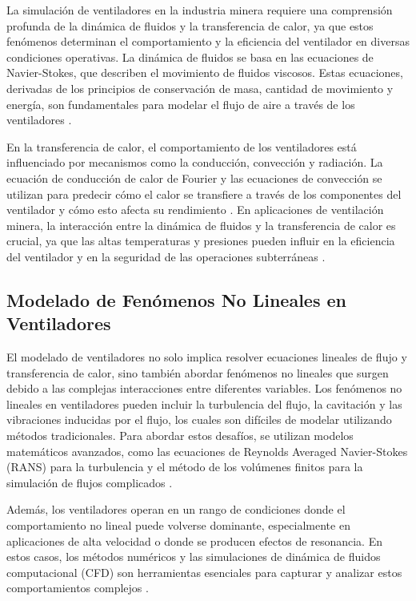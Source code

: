 La simulación de ventiladores en la industria minera requiere una comprensión profunda de la dinámica de fluidos y la transferencia de calor, ya que estos fenómenos determinan el comportamiento y la eficiencia del ventilador en diversas condiciones operativas. La dinámica de fluidos se basa en las ecuaciones de Navier-Stokes, que describen el movimiento de fluidos viscosos. Estas ecuaciones, derivadas de los principios de conservación de masa, cantidad de movimiento y energía, son fundamentales para modelar el flujo de aire a través de los ventiladores \cite{white2006fluid}.

En la transferencia de calor, el comportamiento de los ventiladores está influenciado por mecanismos como la conducción, convección y radiación. La ecuación de conducción de calor de Fourier y las ecuaciones de convección se utilizan para predecir cómo el calor se transfiere a través de los componentes del ventilador y cómo esto afecta su rendimiento \cite{incropera2007fundamentals}. En aplicaciones de ventilación minera, la interacción entre la dinámica de fluidos y la transferencia de calor es crucial, ya que las altas temperaturas y presiones pueden influir en la eficiencia del ventilador y en la seguridad de las operaciones subterráneas \cite{kays2005convective}.

\subsection{Modelado de Fenómenos No Lineales en Ventiladores}

El modelado de ventiladores no solo implica resolver ecuaciones lineales de flujo y transferencia de calor, sino también abordar fenómenos no lineales que surgen debido a las complejas interacciones entre diferentes variables. Los fenómenos no lineales en ventiladores pueden incluir la turbulencia del flujo, la cavitación y las vibraciones inducidas por el flujo, los cuales son difíciles de modelar utilizando métodos tradicionales. Para abordar estos desafíos, se utilizan modelos matemáticos avanzados, como las ecuaciones de Reynolds Averaged Navier-Stokes (RANS) para la turbulencia y el método de los volúmenes finitos para la simulación de flujos complicados \cite{wilcox2006turbulence}.

Además, los ventiladores operan en un rango de condiciones donde el comportamiento no lineal puede volverse dominante, especialmente en aplicaciones de alta velocidad o donde se producen efectos de resonancia. En estos casos, los métodos numéricos y las simulaciones de dinámica de fluidos computacional (CFD) son herramientas esenciales para capturar y analizar estos comportamientos complejos \cite{versteeg2007introduction}.

